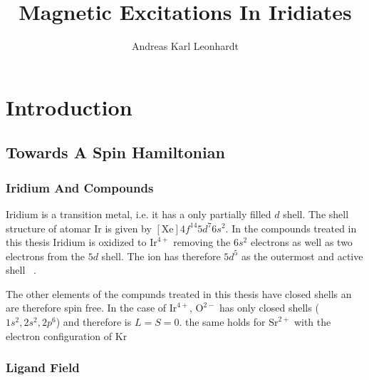 \documentclass[a4paper,10pt]{report}
\title{Magnetic Excitations In Iridiates}
\author{Andreas Karl Leonhardt}
\begin{document}


\tableofcontents

\chapter{Introduction}
\section{Towards A Spin Hamiltonian}

\subsection{Iridium And Compounds}
Iridium is a transition metal, i.e. it has a only partially filled $d$ shell.  
The shell structure of atomar Ir is given by $[\mathrm{Xe}]4f^{14}5d^7 6s^2$.
In the compounds treated in this thesis Iridium is oxidized to $\mathrm{Ir}^{4+}$ 
removing the $6s^2$ electrons as well as two electrons from the $5d$ shell. 
The ion has therefore $5d^5$ as the outermost and active shell ~\cite{Abragam70}.


The other elements of the compunds treated in this thesis have closed shells an are therefore spin free. In the case of $\mathrm{Ir}^{4+}$, 
$\mathrm{O}^{2-}$ has only closed shells ($1s^2,2s^2,2p^6$) and therefore is $L=S=0$.
the same holds for $\mathrm{Sr}^{2+}$ with the electron configuration of $\mathrm{Kr}$

\subsection{Ligand Field}
\end{document}
